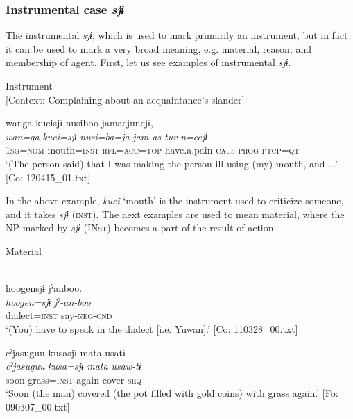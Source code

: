 \subsubsection{Instrumental case \textit{sjɨ}}

The instrumental \textit{sjɨ}, which is used to mark primarily an instrument, but in fact it can be used to mark a very broad meaning, e.g. material, reason, and membership of agent. First, let us see examples of instrumental \textit{sjɨ}.

\ea\label{ex:6-68}
 Instrument\\{}
[Context: Complaining about an acquaintance’s slander]

{\TM}
\glll wanga  kucisjɨ  nusiboo  jamacjuncjɨ,\\
\textit{wan=ga}  \textit{kuci=sjɨ}  \textit{nusi=ba=ja}  \textit{jam-as-tur-n=ccjɨ}\\
    1\textsc{sg}=\textsc{nom}  mouth=\textsc{inst}  \textsc{rfl}=\textsc{acc}=\textsc{top}  have.a.pain-\textsc{caus}-\textsc{prog}-\textsc{ptcp}=\textsc{qt}\\
\glt    ‘(The person\textit{\textsubscript{} }said) that I was making the person ill using (my) mouth, and ...’ [Co: 120415\_01.txt]
\z

In the above example, \textit{kuci} ‘mouth’ is the instrument used to criticize someone, and it takes \textit{sjɨ} (\textsc{inst}). The next examples are used to mean material, where the NP marked by \textit{sjɨ} (IN\textsc{st}) becomes a part of the result of action.

\ea\label{ex:6-69}
  Material

 \ea{}\\
{\TM}
\glll  {\textbar}hoogen{\textbar}sjɨ  jˀanboo.\\
\textit{hoogen=sjɨ}  \textit{jˀ-an-boo}\\
dialect=\textsc{inst}  say-\textsc{neg}-\textsc{cnd}\\
\glt ‘(You) have to speak in the dialect [i.e. Yuwan].’ [Co: 110328\_00.txt]

\ex
{\TM}
\glll cˀjasuguu  kusasjɨ  mata  usatɨ\\
\textit{cˀjasuguu}  \textit{kusa=sjɨ}  \textit{mata}  \textit{usaw-tɨ}\\
soon  grass=\textsc{inst}  again  cover-\textsc{seq}\\
\glt ‘Soon (the man) covered (the pot filled with gold coins) with grass again.’ [Fo: 090307\_00.txt]
\z
\z

